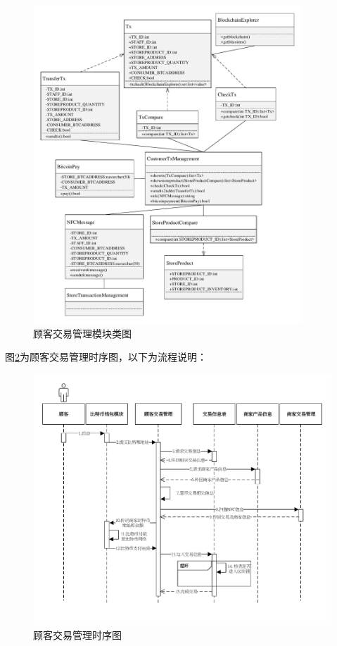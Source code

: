 	\begin{figure}[!htbp]
		\centering
		\includegraphics[width = 0.9\textwidth]{c4.pdf}
		\caption{顾客交易管理模块类图}\label{c4}
	\end{figure}

	

	图\ref{time5}为顾客交易管理时序图，以下为流程说明：

	\begin{figure}[!htbp]
		\centering
		\includegraphics[width = 1\textwidth]{time5.pdf}
		\caption{顾客交易管理时序图}\label{time5}
	\end{figure}

